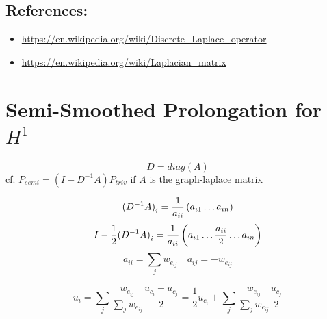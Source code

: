 \documentclass[a4paper,11pt]{scrartcl}
\begin{document}
\subsection{References:}
\begin{itemize}
  \item \url{https://en.wikipedia.org/wiki/Discrete_Laplace_operator}\newline
  \item \url{https://en.wikipedia.org/wiki/Laplacian_matrix}
\end{itemize}

\section{Semi-Smoothed Prolongation for $H^1$}
\[ D = diag(A) \]
cf. $P_{semi} = (I - D^{-1} A) P_{triv}$ if $A$ is the graph-laplace matrix

\[ {(D^{-1} A)}_{i} = \frac{1}{a_{ii}} \del{a_{i1} \dots a_{in}} \]
\[ I - \frac{1}{2} {(D^{-1} A)}_{i} = \frac{1}{a_{ii}} \del{a_{i1} \dots \frac{a_{ii}}{2} \dots a_{in}} \]
\[ a_{ii} = \sum_{j} w_{e_{ij}} \quad a_{ij} = - w_{e_{ij}} \]

\[ u_i = \sum_{j} \frac{w_{e_{ij}}}{\sum_{j} w_{e_{ij}}}\frac{u_{c_i} + u_{c_j} }{2}
       = \frac{1}{2} u_{c_i} + \sum_{j} \frac{w_{e_{ij}}}{\sum_{j} w_{e_{ij}}} \frac{u_{c_j}}{2} \]
\end{document}
